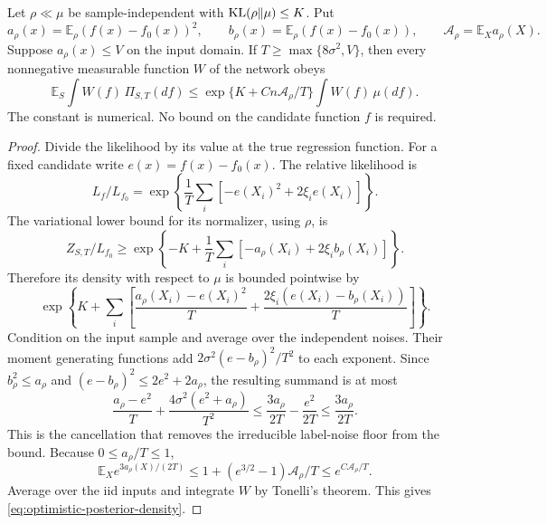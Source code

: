 \begin{lemma}
\label{lem:optimistic-posterior-density}
Let $\rho\ll\mu$ be sample-independent with $\operatorname{KL}(\rho\|\mu)\le K$. Put
\[
 a_\rho(x)=\mathbb E_\rho(f(x)-f_0(x))^2,\qquad
 b_\rho(x)=\mathbb E_\rho(f(x)-f_0(x)),\qquad
 \mathcal A_\rho=\mathbb E_Xa_\rho(X).
\]
Suppose $a_\rho(x)\le V$ on the input domain. If
$T\ge\max\{8\sigma^2,V\}$, then every nonnegative measurable function $W$ of the network obeys
\begin{equation}
 \mathbb E_S\int W(f)\,\Pi_{S,T}(df)
       \le \exp\{K+C n\mathcal A_\rho/T\}\int W(f)\,\mu(df).
 \label{eq:optimistic-posterior-density}
\end{equation}
The constant is numerical. No bound on the candidate function $f$ is required.
\end{lemma}
\begin{proof}
Divide the likelihood by its value at the true regression function. For a fixed candidate write $e(x)=f(x)-f_0(x)$. The relative likelihood is
\[
 L_f/L_{f_0}=\exp\left\{\frac1T\sum_i[-e(X_i)^2+2\xi_i e(X_i)]\right\}.
\]
The variational lower bound for its normalizer, using $\rho$, is
\[
 Z_{S,T}/L_{f_0}\ge
 \exp\left\{-K+\frac1T\sum_i[-a_\rho(X_i)+2\xi_i b_\rho(X_i)]\right\}.
\]
Therefore its density with respect to $\mu$ is bounded pointwise by
\[
 \exp\left\{K+\sum_i\left[
   \frac{a_\rho(X_i)-e(X_i)^2}{T}
       +\frac{2\xi_i(e(X_i)-b_\rho(X_i))}{T}\right]\right\}.
\]
Condition on the input sample and average over the independent noises. Their moment generating functions add
$2\sigma^2(e-b_\rho)^2/T^2$ to each exponent. Since
$b_\rho^2\le a_\rho$ and $(e-b_\rho)^2\le2e^2+2a_\rho$, the resulting summand is at most
\[
 \frac{a_\rho-e^2}{T}
       +\frac{4\sigma^2(e^2+a_\rho)}{T^2}
 \le \frac{3a_\rho}{2T}-\frac{e^2}{2T}
 \le \frac{3a_\rho}{2T}.
\]
This is the cancellation that removes the irreducible label-noise floor from the bound. Because $0\le a_\rho/T\le1$,
\[
 \mathbb E_X e^{3a_\rho(X)/(2T)}
 \le 1+(e^{3/2}-1)\mathcal A_\rho/T
 \le e^{C\mathcal A_\rho/T}.
\]
Average over the iid inputs and integrate $W$ by Tonelli's theorem. This gives \eqref{eq:optimistic-posterior-density}.
\end{proof}


